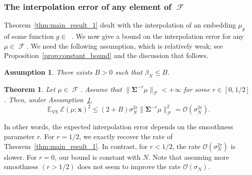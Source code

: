 \documentclass[twoside,11pt]{book}
\newtheorem{theorem}{Theorem}
\newtheorem{assumption}{Assumption}
\DeclareMathOperator{\VS}{\mathrm{VS}}
\DeclareMathOperator{\EX}{\mathbb{E}}
\DeclareMathOperator{\F}{\mathcal{F}}
\DeclareMathOperator{\Ltwo}{\mathbb{L}_{2}(\mathrm{d} \omega)}
\newcommand{\pc}[1]{\textcolor{blue}{#1}}
\begin{document}



\subsubsection{The interpolation error of any element of $\F$}\label{sec:main_theorems_2}
%
%
Theorem~\ref{thm:main_result_1} dealt with the interpolation of an embedding $\mu_{g}$ of some function $g\in\Ltwo$. We now give a bound on the interpolation error for any $\mu\in\F$. We need the following assumption, which is relatively weak; see Proposition~\ref{prop:constant_bound} and the discussion that follows.

\begin{assumption}\label{hyp:beta_N_bounded}
	There exists $B >0$ such that $\beta_{N} \leq B$.
\end{assumption}

\begin{theorem}\label{thm:slow_rates}
Let $\mu \in \F$.
Assume that $\|\bm{\Sigma}^{-r}\mu \|_{\F} < +\infty$ for some $r \in [0,1/2]$. Then, under Assumption~\ref{hyp:beta_N_bounded},
\begin{equation}
\EX_{\VS} \mathcal{E}(\mu;\bm{x})^{2} \leq (2+B) \sigma_{N}^{2r} \|\bm{\Sigma}^{-r} \mu\|_{\F}^{2} = \mathcal{O}(\sigma_{N}^{2r}).
\end{equation}
%
\end{theorem}
%
%
In other words, the expected interpolation error depends on the smoothness parameter $r$. For $r =1/2$, we exactly recover the rate of Theorem~\ref{thm:main_result_1}. In contrast, for $r<1/2$, the rate $\mathcal{O}(\sigma_{N}^{2r})$ is slower. For $r=0$, our bound is constant with $N$. Note that assuming more smoothness $(r>1/2)$ does not seem to improve the rate $\mathcal{O}(\sigma_{N})$.
\end{document}

